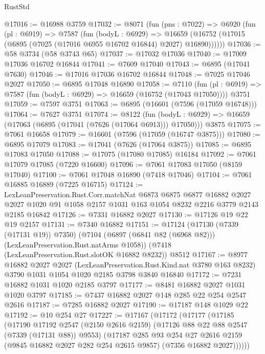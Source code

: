 \begin{lexlean}{RustStd}
\begin{coremodule}
@17016 := @16988 @3759
@17032 := @8071
    (fun (pns : @7022) =>
    @6920
      (fun (pl : @6919) =>
      @7587
        (fun (bodyL : @6929) =>
        @16659 (@16752 (@17015 (@6895 (@7025 (@17016 @6955 @16702 @16844) @2027) @16890))))))
@17036 := @58 @3734 (@58 @3743 @65)
@17037 := @17032 @17036
@17040 := @17009 @17036 @16702 @16844
@17041 := @7609 @17040
@17043 := @6895 (@17041 @7630)
@17046 := @17016 @17036 @16702 @16844
@17048 := @7025 @17046 @2027
@17050 := @6895 @17048 @16890
@17058 := @7110
    (fun (pl : @6919) => @7587 (fun (bodyL : @6929) => @16659 (@16752 (@17043 @17050))))
    @3751
@17059 := @7597 @3751
@17063 := @6895 (@16601 (@7596 (@17059 @16748)))
@17064 := @7627 @3751
@17074 := @8122
    (fun (bodyL : @6929) => @16659 (@17063 (@6895 (@17041 (@7626 (@17064 @6913))) @17050)))
    @3875
@17075 := @7061 @16658
@17079 := @16601 (@7596 (@17059 (@16747 @3875)))
@17080 := @6895 @17079
@17083 := @17041 (@7626 (@17064 @3875))
@17085 := @6895 @17083 @17050
@17088 := @17075 (@17080 @17085) @16184
@17092 := @7061 @17079 @17085 (@7220 @16600)
@17096 := @7061 @17083 @17050 (@8159 @17040)
@17100 := @7061 @17048 @16890 (@7418 @17046)
@17104 := @7061 @16885 @16889 (@7225 @16715)
@17124 := LexLeanPreservation.Rust.Corr.matchNat
    @6873
    @6875
    @6877
    @16882
    @2027
    @2027
    @1020
    @91
    @1058
    @2157
    @1031
    @163
    @1054
    @8232
    @2216
    @3779
    @2143
    @2185
    @16842
@17126 := @7331 @16882 @2027
@17130 := @17126 @19 @22 @19 @2157
@17131 := @7340 @16882
@17151 := @17124
    (@17130 (@7339 (@17131 @19)) @7350)
    (@7104 (@6897 (@6841 @82 (@6968 @82))) (LexLeanPreservation.Rust.natArms @1058))
    (@7418 (LexLeanPreservation.Rust.slotOK @16882 @8232))
    @8512
@17167 := @8977
    @16882
    @2027
    @2027
    (LexLeanPreservation.Rust.Kind.nat @3780 @163 @8232)
    @3790
    @1031
    @1054
    @1020
    @2185
    @3798
    @3840
    @16840
@17172 := @7231 @16882 @1031 @1020 @2185 @3797
@17177 := @8481 @16882 @2027 @1031 @1020 @3797
@17185 := @7437 @16882 @2027 @148 @285 @22 @254 @2547 @2616
@17187 := @7285 @16882 @2027
@17190 := @17187 @148 @1029 @22
@17192 := @10 @254 @27
@17227 := @17167
    (@17172
      (@17177
        (@17185
          (@17190
            @17192
            @2547
            (@2150 @2616 @2159)
            (@17126 @88 @22 @88 @2547 (@7339 (@17131 @88)) @9553)
            (@17187
              @285
              @93
              @254
              @27
              @2616
              @2159
              (@9845 @16882 @2027 @282 @254 @2615 @9857)
              (@7356 @16882 @2027))))))

\end{coremodule}
\end{lexlean}
